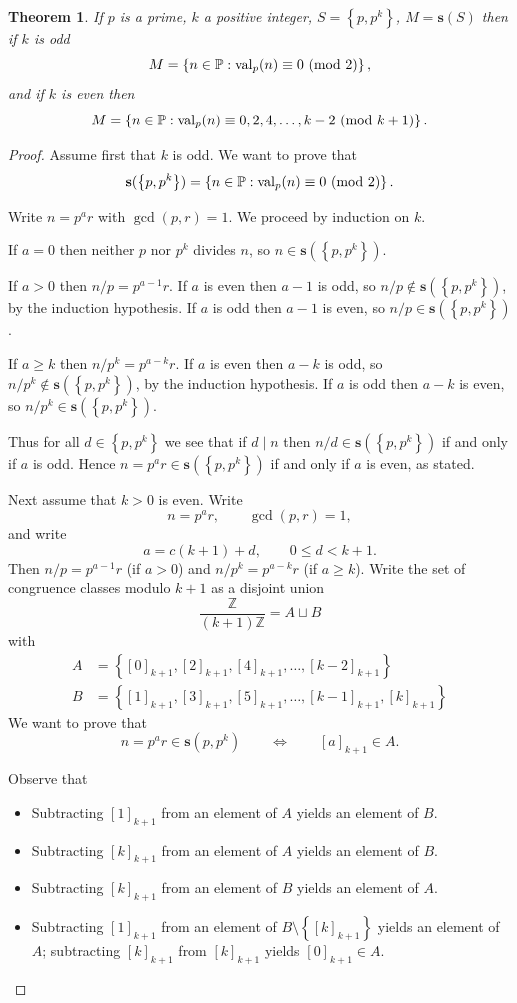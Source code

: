 \documentclass[12pt]{article}
\theoremstyle{definition}
\theoremstyle{remark}
\theoremstyle{plain}
\newtheorem{theorem}[lemma]{Theorem}
\newcommand{\modd}[2]{#1\ \textup{(mod }#2\textup{)}}
\newcommand{\set}[1]{\left\{{#1}\right\}}
\newcommand\setsuchas[2]{\left\{{#1}:{#2}\right\}}
\newcommand{\NNp}{{\mathbb{P}}}
\newcommand{\ZZ}{{\mathbb{Z}}}
\newcommand{\val}{\operatorname{val}}
\newcommand{\divides}[2]{#1 \mid #2}
\newcommand{\ssift}[1]{\mathbf{s}({#1})}
\begin{document}
\begin{theorem}
If \(p\) is a prime, \(k\) a positive integer, \(S=\set{p,p^{k}}\), \(M=\ssift{S}\) then if \(k\) is odd
\[M = \setsuchas{n \in \NNp}{\val_{p}(n) \equiv \modd{0}{2}},\]
and if \(k\) is even then
\[M = \setsuchas{n \in \NNp}{\val_{p}(n) \equiv \modd{0,2,4, \dots, k-2}{k+1}}.\]
\label{org2dba548}
\end{theorem}
\begin{proof}
Assume first that \(k\) is odd.
We want to prove that
\[\ssift{\set{p,p^{k}}} = \setsuchas{n \in \NNp}{\val_{p}(n) \equiv \modd{0}{2}}.\]

Write \(n=p^{a}r\) with \(\gcd(p,r)=1\). We proceed by induction on \(k\).

If \(a=0\) then neither \(p\) nor \(p^{k}\) divides \(n\), so \(n \in \ssift{\set{p,p^{k}}}\).

If \(a>0\) then \(n/p=p^{a-1}r\).
If \(a\) is even then \(a-1\) is odd,
so \(n/p \not \in \ssift{\set{p,p^{k}}}\), by the induction hypothesis.
If \(a\) is odd then \(a-1\) is even,
so \(n/p \in \ssift{\set{p,p^{k}}}\).

If \(a \ge k\) then \(n/p^{k}=p^{a-k}r\).
If \(a\) is even then \(a-k\) is odd,
so \(n/p^{k} \not \in \ssift{\set{p,p^{k}}}\), by the induction hypothesis.
If \(a\) is odd then \(a-k\) is even,
so \(n/p^{k} \in \ssift{\set{p,p^{k}}}\).

Thus for all \(d \in \set{p,p^{k}}\) we see that if \(\divides{d}{n}\) then
\(n/d \in \ssift{\set{p,p^{k}}}\) if and only if \(a\) is odd. Hence
\(n=p^{a}r \in \ssift{\set{p,p^{k}}}\) if and only if \(a\) is even, as stated.

Next assume that \(k>0\) is even. Write
\[n=p^{a}r, \qquad \gcd(p,r)=1,\]
and write
\[a= c(k+1) + d,  \qquad 0 \le d < k+1.\]
Then \(n/p = p^{a-1}r\) (if \(a>0\)) and \(n/p^{k} = p^{a-k}r\) (if \(a \ge k\)).
Write the set of congruence classes modulo \(k+1\) as a disjoint union
\begin{displaymath}
\frac{\ZZ}{(k+1)\ZZ}  = A \sqcup B
\end{displaymath}
with
\begin{align*}
A & =  \set{[0]_{k+1}, [2]_{k+1}, [4]_{k+1}, \dots, [k-2]_{{k+1}}} \\
B &=  \set{[1]_{k+1}, [3]_{k+1}, [5]_{k+1}, \dots, [k-1]_{k+1}, [k]_{k+1}}
\end{align*}
We want to prove that
\[n=p^{a}r \in \ssift{p,p^{k}} \qquad \iff \qquad [a]_{k+1} \in A.\]

Observe that
\begin{itemize}[label={\(\star\)}]
\item Subtracting \([1]_{k+1}\) from an element of \(A\) yields an element of \(B\).
\item Subtracting \([k]_{{k+1}}\) from an element of \(A\) yields an element of \(B\).
\item Subtracting \([k]_{k+1}\) from an element of \(B\) yields an element of \(A\).
\item Subtracting \([1]_{k+1}\) from an element of \(B \setminus \set{[k]_{k+1}}\) yields an element of \(A\);
subtracting \([k]_{k+1}\) from \([k]_{k+1}\) yields \([0]_{k+1} \in A\).
\end{itemize}


\end{proof}
\end{document}
